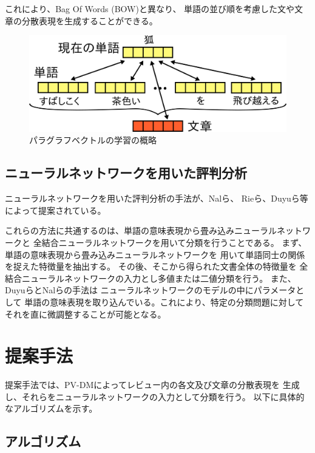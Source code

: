 \documentclass[twocolumn,a4paper]{ltjarticle}
\makeatletter
\let\tti@includegraphics\includegraphics
\renewcommand{\includegraphics}[1]{%
    \tti@includegraphics[width=\linewidth]{#1}}
\makeatother
\begin{document}
これにより、Bag Of Words (BOW)と異なり、
単語の並び順を考慮した文や文章の分散表現を生成することができる。

\begin{figure}
  \includegraphics{fig/paragraph_vector.png}
  \caption{パラグラフベクトルの学習の概略}
  \label{fig:ParagraphVector}
\end{figure}


\subsection{ニューラルネットワークを用いた評判分析}

ニューラルネットワークを用いた評判分析の手法が、Nalら\cite{nal14}、
Rieら\cite{rie14}、Duyuら\cite{duyu15}等によって提案されている。

これらの方法に共通するのは、単語の意味表現から畳み込みニューラルネットワークと
全結合ニューラルネットワークを用いて分類を行うことである。
まず、単語の意味表現から畳み込みニューラルネットワークを
用いて単語同士の関係を捉えた特徴量を抽出する。
その後、そこから得られた文書全体の特徴量を
全結合ニューラルネットワークの入力とし多値または二値分類を行う。
また、Duyuら\cite{duyu15}とNalら\cite{nal14}の手法は
ニューラルネットワークのモデルの中にパラメータとして
単語の意味表現を取り込んでいる。これにより、特定の分類問題に対して
それを直に微調整することが可能となる。



\section{提案手法}

提案手法では、PV-DMによってレビュー内の各文及び文章の分散表現を
生成し、それらをニューラルネットワークの入力として分類を行う。
以下に具体的なアルゴリズムを示す。


\subsection{アルゴリズム}
\end{document}
